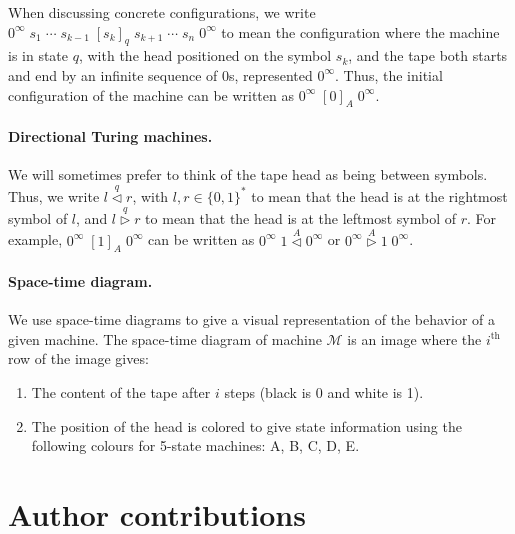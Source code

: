 \documentclass[a4paper,british]{article}
\theoremstyle{definition} %
\numberwithin{equation}{section}
\theoremstyle{definition} %
\newcommand{\lhead}[1]{\stackrel{#1}\triangleleft}
\newcommand{\rhead}[1]{\stackrel{#1}\triangleright}
\begin{document}
When discussing concrete configurations, we write
$0^\infty\; s_1\; \cdots\; s_{k-1}\; [s_k]_q\; s_{k+1}\; \cdots\; s_n\; 0^\infty$
to mean the configuration where the machine is in state $q$, with the head
positioned on the symbol $s_k$, and the tape both starts and end by an infinite sequence of 0s, represented $0^\infty$. Thus, the initial configuration of the machine
can be written as $0^\infty\; [0]_A\; 0^\infty$.

\paragraph*{Directional Turing machines.} We will sometimes prefer to think of the tape head as being between
symbols. Thus, we write $l \lhead{q} r$, with $l,r\in\{0,1\}^*$ to mean that the head is at the rightmost symbol
of $l$, and $l \rhead{q} r$ to mean that the head is at the leftmost symbol of $r$.
For example, $0^\infty\; [1]_A\; 0^\infty$ can be written as
$0^\infty\; 1 \lhead A 0^\infty$ or $0^\infty \rhead A 1\; 0^\infty$.


\paragraph*{Space-time diagram.} We use space-time diagrams to give a visual representation of the behavior of a given machine. The space-time diagram of machine $\mathcal{M}$ is an image where the $i^\text{th}$ row of the image gives:
\begin{enumerate}
  \item The content of the tape after $i$ steps (black is 0 and white is 1).
  \item The position of the head is colored to give state information using the following colours for 5-state machines: \textcolor{colorA}{A},  \textcolor{colorB}{B},  \textcolor{colorC}{C},  \textcolor{colorD}{D},  \textcolor{colorE}{E}.
\end{enumerate}








\appendix

\section{Author contributions}
\end{document}
